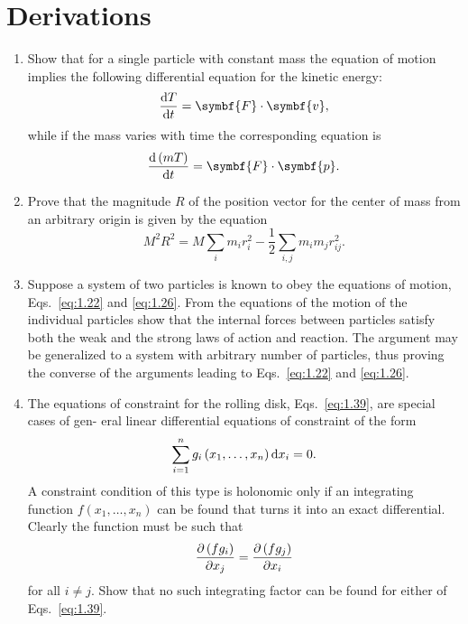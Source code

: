 \section*{Derivations}

\begin{enumerate}
    \item Show that for a single particle with constant mass the equation of motion implies the following differential equation for the kinetic energy:
    \begin{equation*}
        \odv{T}{t}=\symbf{F}\cdot\symbf{v},
    \end{equation*}
    while if the mass varies with time the corresponding equation is
    \begin{equation*}
        \odv{\left(mT\right)}{t}=\symbf{F}\cdot\symbf{p}.
    \end{equation*}
    \item Prove that the magnitude \(R\) of the position vector for the center of mass from an arbitrary origin is given by the equation
    \begin{equation*}
        M^2R^2=M\sum_im_ir_i^2-\frac{1}{2}\sum_{i,j}m_im_jr_{ij}^2.
    \end{equation*}
    \item Suppose a system of two particles is known to obey the equations of motion, Eqs.~\eqref{eq:1.22} and \eqref{eq:1.26}. From the equations of the motion of the individual particles show that the internal forces between particles satisfy both the weak and the strong laws of action and reaction. The argument may be generalized to a system with arbitrary number of particles, thus proving the converse of the arguments leading to Eqs.~\eqref{eq:1.22} and \eqref{eq:1.26}.
    \item\label{derivation:1.4} The equations of constraint for the rolling disk, Eqs.~\eqref{eq:1.39}, are special cases of gen- eral linear differential equations of constraint of the form
    \begin{equation*}
        \sum_{i=1}^ng_i\left(x_1,\ldots,x_n\right)\odif{x_i}=0.
    \end{equation*}
    A constraint condition of this type is holonomic only if an integrating function \(f\left(x_1,\ldots,x_n\right)\) can be found that turns it into an exact differential. Clearly the function must be such that
    \begin{equation*}
        \pdv{\left(fg_i\right)}{x_j}=\pdv{\left(fg_j\right)}{x_i}
    \end{equation*}
    for all \(i\ne j\). Show that no such integrating factor can be found for either of Eqs.~\eqref{eq:1.39}.

\end{enumerate}
